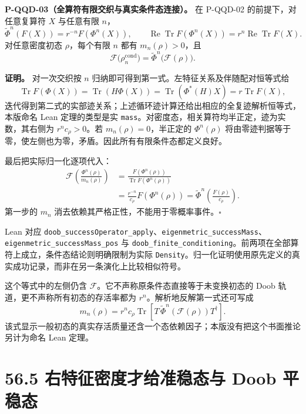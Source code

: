 \documentclass[
  11pt,
  oneside]{book}
\begin{document}
\protect\hypertarget{p-qqd-03}{}{}

\textbf{P-QQD-03（全算符有限交织与真实条件态连接）。} 在 P-QQD-02
的前提下，对任意复算符 \(X\) 与任意有限 \(n\)， \[
\widetilde\Phi^n(F(X))=r^{-n}F(\Phi^n(X)),
\qquad \operatorname{Re}\operatorname{Tr}F(\Phi^n(X))=r^n\operatorname{Re}\operatorname{Tr}F(X).
\] 对任意密度初态 \(\rho\)，每个有限 \(n\) 都有 \(m_n(\rho)>0\)，且 \[
\mathcal F\bigl(\rho_n^{\mathrm{cond}}\bigr)
=\widetilde\Phi^n\bigl(\mathcal F(\rho)\bigr).
\]

\textbf{证明。} 对一次交织按 \(n\)
归纳即可得到第一式。左特征关系及伴随配对恒等式给 \[
\operatorname{Tr}F(\Phi(X))
=\operatorname{Tr}(H\Phi(X))
=\operatorname{Tr}(\Phi^*(H)X)
=r\operatorname{Tr}F(X),
\]
迭代得到第二式的实部迹关系；上述循环迹计算还给出相应的全复迹解析恒等式，本版命名
Lean 定理的类型是实
\texttt{mass}。对密度态，相关算符均半正定，迹为实数，其右侧为
\(r^nc_\rho>0\)。若 \(m_n(\rho)=0\)，半正定的 \(\Phi^n(\rho)\)
将由零迹判据等于零，使左侧也为零，矛盾。因此所有有限条件态都定义良好。

最后把实际归一化逐项代入： \[
\begin{aligned}
\mathcal F\!\left(\frac{\Phi^n(\rho)}{m_n(\rho)}\right)
&=\frac{F(\Phi^n(\rho))}{\operatorname{Tr}F(\Phi^n(\rho))}\\
&=\frac{r^{-n}}{c_\rho}F(\Phi^n(\rho))
=\widetilde\Phi^n\!\left(\frac{F(\rho)}{c_\rho}\right).
\end{aligned}
\] 第一步的 \(m_n\) 消去依赖其严格正性，不能用于零概率事件。\(\square\)

Lean 对应
\texttt{doob\_\allowbreak successOperator\_\allowbreak apply}、\allowbreak \texttt{eigenmetric\_\allowbreak successMass}、\allowbreak \texttt{eigenmetric\_\allowbreak successMass\_\allowbreak pos}
与
\texttt{doob\_\allowbreak finite\_\allowbreak conditioning}。前两项在全部算符上成立，条件态结论则明确限制为实际
\texttt{Density}。归一化证明使用原先定义的真实成功记录，而非在另一条演化上比较相似符号。

这个等式中的左侧仍含
\(\mathcal F\)。它不声称原条件态直接等于未变换初态的 Doob
轨道，更不声称所有初态的存活率都为 \(r^n\)。解析地反解第一式还可写成 \[
m_n(\rho)=r^nc_\rho\operatorname{Tr}\!\left[
T\,\widetilde\Phi^n(\mathcal F(\rho))T^\dagger\right].
\]
该式显示一般初态的真实存活质量还含一个态依赖因子；本版没有把这个书面推论另计为命名
Lean 定理。

\hypertarget{ux53f3ux7279ux5f81ux5bc6ux5ea6ux624dux7ed9ux51c6ux7a33ux6001ux4e0e-doob-ux5e73ux7a33ux6001}{%
\section{56.5 右特征密度才给准稳态与 Doob
平稳态}\label{ux53f3ux7279ux5f81ux5bc6ux5ea6ux624dux7ed9ux51c6ux7a33ux6001ux4e0e-doob-ux5e73ux7a33ux6001}}
\end{document}
